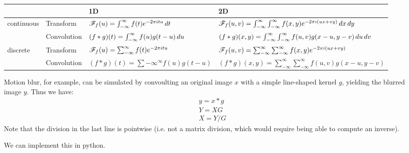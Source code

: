 \begin{table}[]
    \begin{tabular}{@{}llll@{}}
    \toprule
                                &             & 1D                                                                              & 2D                                                \\ 
    \midrule
    \multirow{2}{*}{continuous} & Transform   & $\mathscr{F}_f(u)  = \int_{-\infty}^{\infty} f(t) e^{-2\pi i t u} \mathop{dt}$         & $\mathscr{F}_f(u, v)  = \int_{-\infty}^{\infty} \int_{-\infty}^{\infty} f(x, y) e^{-2\pi i (ux + vy)} \mathop{dx} \mathop{dy}$         \\
                                & Convolution & $(f * g)(t)     = \int_{-\infty}^{\infty} f(u) g(t-u) \mathop{du}$                  & $(f * g)(x, y)     = \int_{-\infty}^{\infty} \int_{-\infty}^{\infty} f(u, v) g(x-u, y-v) \mathop{du} \mathop{dv}$                      \\
    \multirow{2}{*}{discrete}   & Transform   & $\mathscr{F}_f(u)  = \sum_{-\infty}^{\infty} f(t) e^{-2\pi i t u} $                & $\mathscr{F}_f(u, v)  = \sum_{-\infty}^{\infty} \sum_{-\infty}^{\infty} f(x, y) e^{-2\pi i (ux + vy)} $                \\
                                & Convolution & $(f * g)(t) = \sum{-\infty}^{\infty} f(u) g(t-u) $                              & $(f * g)(x, y) = \sum_{-\infty}^{\infty} \sum_{-\infty}^{\infty} f(u, v) g(x-u, y-v) $                         \\
    \end{tabular}
\end{table}

Motion blur, for example, can be simulated by convoulting an original image $x$ with a simple line-shaped kernel $g$, yielding the blurred image $y$.
Thus we have: 
\begin{equation}
    \begin{split}
        y = x * g \\
        Y = X G \\
        X = Y / G
    \end{split}
\end{equation}
Note that the division in the last line is pointwise (i.e. not a matrix division, which would require being able to compute an inverse).

We can implement this in python.

